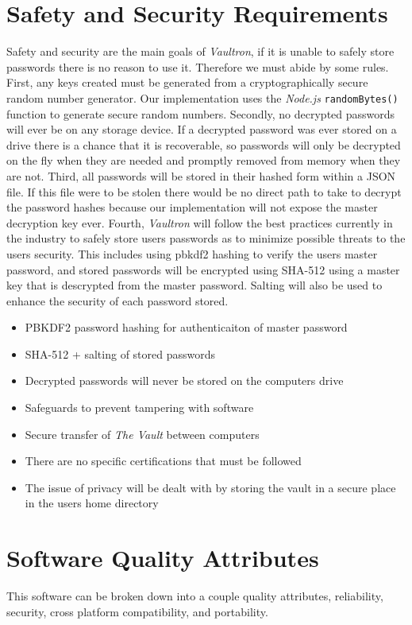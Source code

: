 \documentclass[11pt]{report}
\newenvironment{myitemize}
{ \begin{itemize}
    \setlength{\itemsep}{0pt}
    \setlength{\parskip}{0pt}
    \setlength{\parsep}{0pt}     }
{ \end{itemize}                  }
\begin{document}
\section{Safety and Security Requirements}
Safety and security are the main goals of \textit{Vaultron}, if it is
unable to safely store passwords there is no reason to use it. Therefore
we must abide by some rules. First, any keys created must be generated
from a cryptographically secure random number generator. Our implementation
uses the \textit{Node.js} \texttt{randomBytes()} function to generate
secure random numbers. Secondly, no decrypted passwords will ever be
on any storage device. If a decrypted password was ever stored on a drive
there is a chance that it is recoverable, so passwords will only be 
decrypted on the fly when they are needed and promptly removed from
memory when they are not. Third, all passwords will be stored in their
hashed form within a JSON file. If this file were to be stolen there
would be no direct path to take to decrypt the password hashes because
our implementation will not expose the master decryption key ever. 
Fourth, \textit{Vaultron} will follow the best practices currently in the
industry to safely store users passwords as to minimize possible threats
to the users security. This includes using pbkdf2 hashing to verify
the users master password, and stored passwords will be encrypted using
SHA-512 using a master key that is descrypted from the master password.
Salting will also be used to enhance the security of each password stored.

\begin{myitemize}
    \item PBKDF2 password hashing for authenticaiton of master password
    \item SHA-512 + salting of stored passwords
    \item Decrypted passwords will never be stored on the computers drive
    \item Safeguards to prevent tampering with software
    \item Secure transfer of \textit{The Vault} between computers
    \item There are no specific certifications that must be followed
    \item The issue of privacy will be dealt with by storing the vault in a secure place in the users home directory
\end{myitemize}


\section{Software Quality Attributes}
This software can be broken down into a couple quality attributes,
reliability, security, cross platform compatibility, and portability.
\end{document}
